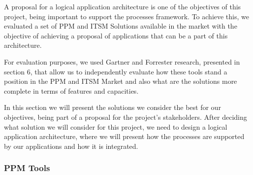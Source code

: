 A proposal for a logical application architecture is one of the objectives of this project, being important to support the processes framework. To achieve this, we evaluated a set of PPM and ITSM Solutions available in the market with the objective of achieving a proposal of applications that can be a part of this architecture.\par
For evaluation purposes, we used Gartner and Forrester research, presented in section 6, that allow us to independently evaluate how these tools stand a position in the PPM and ITSM Market and also what are the solutions more complete in terms of features and capacities.\par
In this section we will present the solutions we consider the best for our objectives, being part of a proposal for the project's stakeholders. After deciding what solution we will consider for this project, we need to design a logical application architecture, where we will present how the processes are supported by our applications and how it is integrated.\par

\subsubsection{PPM Tools}

